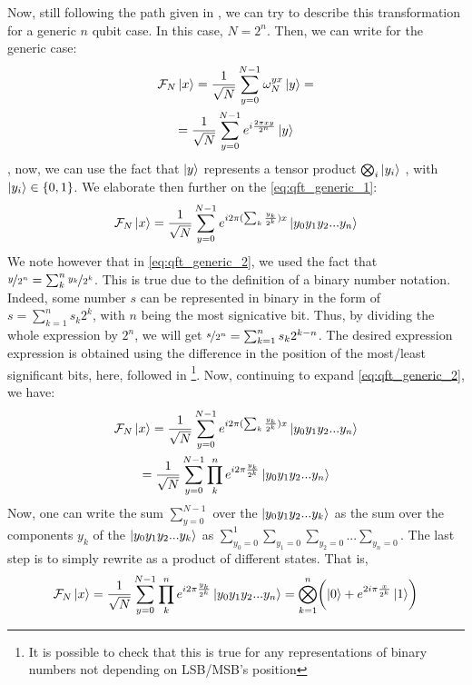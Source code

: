 Now, still following the path given in \cite{noauthor_quantum_nodate}, we can try to describe 
this transformation for a generic $n$ qubit case. In this case, $N=2^n$. Then, we can write 
for the generic case:
\begin{gather}
  \mathcal{F}_N \ket{x} = \frac{1}{\sqrt{N}}\sum_{y=0}^{N-1} \omega_N^{yx}\ket{y} =\\ 
                        = \frac{1}{\sqrt{N}} \sum_{y=0}^{N-1} e^{i\frac{2\pi xy}{2^n}} \ket{y}
\label{eq:qft_generic_1}
\end{gather}
, now, we can use the fact that $\ket{y}$ represents a tensor product $\bigotimes_i\ket{y_i}$ , 
with $\ket{y_i}\in \{0,1\}$. We elaborate then further on the \autoref{eq:qft_generic_1}:
\begin{gather}
  \mathcal{F}_N \ket{x} = \frac{1}{\sqrt{N}} \sum_{y=0}^{N-1} e^{i2\pi (\sum_k \frac{y_k}{2^k})x} \ket{y_0 y_1 y_2...y_n}
  \label{eq:qft_generic_2}
\end{gather}
We note however that in \autoref{eq:qft_generic_2}, we used the fact that 
$\nicefrac{y}{2^n}=\sum_k^n \nicefrac{y_k}{2^k}$. This is true due to the definition of a binary 
number notation. Indeed, some number $s$ can be represented in binary in the form of 
$s=\sum_{k=1}^{n} s_k 2^k$, with $n$ being the most signicative bit. Thus, by dividing the whole expression 
by $2^n$, we will get $\nicefrac{s}{2^n}=\sum_{k=1}^{n} s_k 2^{k-n}$. The desired expression expression 
is obtained using the difference in the position of the most/least significant bits, here, 
followed in \cite{noauthor_quantum_nodate}\footnote{It is possible to check that this is true for 
any representations of binary numbers not depending on LSB/MSB's position}.
Now, continuing to expand \autoref{eq:qft_generic_2}, we have:
\begin{gather}
  \mathcal{F}_N \ket{x} = \frac{1}{\sqrt{N}} \sum_{y=0}^{N-1} e^{i2\pi (\sum_k \frac{y_k}{2^k})x}\ket{y_0 y_1 y_2...y_n} \\
  = \frac{1}{\sqrt{N}} \sum_{y=0}^{N-1} \prod_{k}^{n} e^{i2\pi \frac{y_k}{2^k}}\ket{y_0 y_1 y_2...y_n}
\end{gather}
Now, one can write the sum $\sum_{y=0}^{N-1}$ over the $\ket{y_0y_1y_2...y_k}$ 
as the sum over the components $y_k$ of the $\ket{y_0y_1y_2...y_k}$ as 
$\sum_{y_0=0}^{1}\sum_{y_1=0}\sum_{y_2=0}...\sum_{y_n=0}$.
The last step \cite{hosgood_introduction_nodate} is to simply rewrite as a 
product of different states. That is,
\begin{gather}
  \mathcal{F}_N \ket{x} = \frac{1}{\sqrt{N}} \sum_{y=0}^{N-1} \prod_{k}^{n} e^{i2\pi \frac{y_k}{2^k}}\ket{y_0 y_1 y_2...y_n} = 
  \bigotimes_{k=1}^{n}\biggl( \ket{0}+e^{2i\pi\frac{x}{2^k}}\ket{1} \biggr)
\end{gather}

